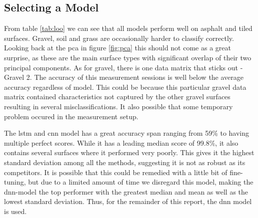 \subsection{Selecting a Model}


From table \ref{tab:loo} we can see that all models perform well on asphalt and tiled surfaces. Gravel, soil and grass are occasionally harder to classify correctly. Looking back at the \gls{pca} in figure \ref{fig:pca} this should not come as a great surprise, as these are the main surface types with significant overlap of their two principal components. As for gravel, there is one data matrix that sticks out - Gravel 2. The accuracy of this measurement sessions is well below the average accuracy regardless of model. This could be because this particular gravel data matrix contained characteristics not captured by the other gravel surfaces resulting in several misclassifications. It also possible that some temporary problem occured in the measurement setup.

The \gls{lstm} and \gls{cnn} model has a great accuracy span ranging from 59\% to having multiple perfect scores. While it has a leading median score of 99.8\%, it also contains several surfaces where it performed very poorly. This gives it the highest standard deviation among all the methods, suggesting it is not as robust as its competitors. It is possible that this could be remedied with a little bit of fine-tuning, but due to a limited amount of time we disregard this model, making the \gls{dnn}-model the top performer with the greatest median and mean as well as the lowest standard deviation. Thus, for the remainder of this report, the \gls{dnn} model is used.







